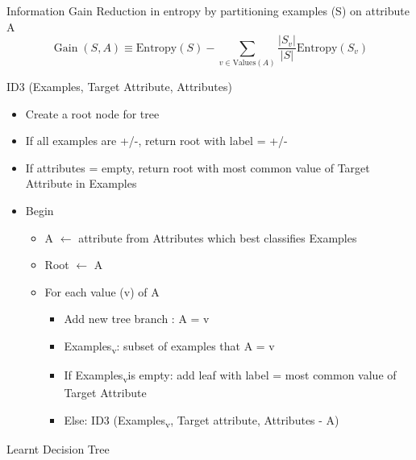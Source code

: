 \documentclass[usenames,dvipsnames]{beamer}
\begin{document}
\begin{frame}{Information Gain}
 Reduction in entropy
by partitioning examples (S) on attribute A
$$
\operatorname{Gain}(S, A) \equiv \text{Entropy}(S)-\sum_{v \in \text{Values}(A)} \frac{|S_{v}|}{|S|} \text{Entropy}(S_{v})
$$
\end{frame}


\begin{frame}{ID3 (Examples, Target Attribute, Attributes)}
\begin{itemize}[<+->]
	\item Create a root node for tree
	\item If all examples are +/-, return root with label = +/-
	\item  If attributes = empty, return root with most common value of
	Target Attribute in Examples
	\item Begin
	\begin{itemize}[<+->]
		\item A $\leftarrow$ attribute from Attributes which best classifies
		Examples
		\item 	Root $\leftarrow$ A
		\item  For each value (v) of A
		\begin{itemize}[<+->]
			\item Add new tree branch : A = v
			\item  Examples\textsubscript{v}: subset of examples that A = v
			\item If Examples\textsubscript{v}is empty: add leaf with label = most
			common value of Target Attribute
			\item Else: ID3 (Examples\textsubscript{v}, Target attribute, Attributes - {A})
		\end{itemize}
	\end{itemize}


\end{itemize}
\end{frame}

\begin{frame}{Learnt Decision Tree}

\end{frame}
\end{document}

